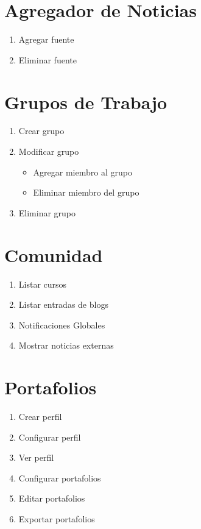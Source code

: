 \documentclass{article}
\begin{document}
\section{Agregador de Noticias}
\begin{enumerate}
	\item Agregar fuente
	\item Eliminar fuente
\end{enumerate}

\section{Grupos de Trabajo}
\begin{enumerate}
	\item Crear grupo
	\item Modificar grupo
	\begin{itemize}
	 \item Agregar miembro al grupo
	 \item Eliminar miembro del grupo
	\end{itemize}

	\item Eliminar grupo
\end{enumerate}

\section{Comunidad}
\begin{enumerate}	
	\item Listar cursos
	\item Listar entradas de blogs
	\item Notificaciones Globales
	\item Mostrar noticias externas
\end{enumerate}

\section{Portafolios}
\begin{enumerate}	
	\item Crear perfil
	\item Configurar perfil
	\item Ver perfil
	\item Configurar portafolios
	\item Editar portafolios
	\item Exportar portafolios
\end{enumerate}	
\end{document}
